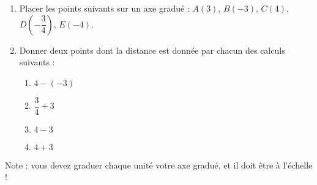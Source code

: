
\begin{exercice}\label{exo2smath-0238}

    \setlength{\columnseprule}{0pt}       %
    \begin{enumerate}
        \item
            Placer les points suivants sur un axe gradué : \( A(3)\), \( B(-3)\), \( C(4)\), \( D(-\dfrac{ 3 }{ 4 })\), \( E(-4)\).
        \item
            Donner deux points dont la distance est donnée par chacun des calculs suivants :
            \begin{multicols}{2}
            \begin{enumerate}
                \item
                    \( 4-(-3)\)
                \item
                    \( \dfrac{ 3 }{ 4 }+3\)
                \item
                    \( 4-3\)
                \item
                    \( 4+3\)
            \end{enumerate}
            \end{multicols}
    \end{enumerate}

    Note : vous devez graduer chaque unité votre axe gradué, et il doit être à l'échelle !

\end{exercice}

